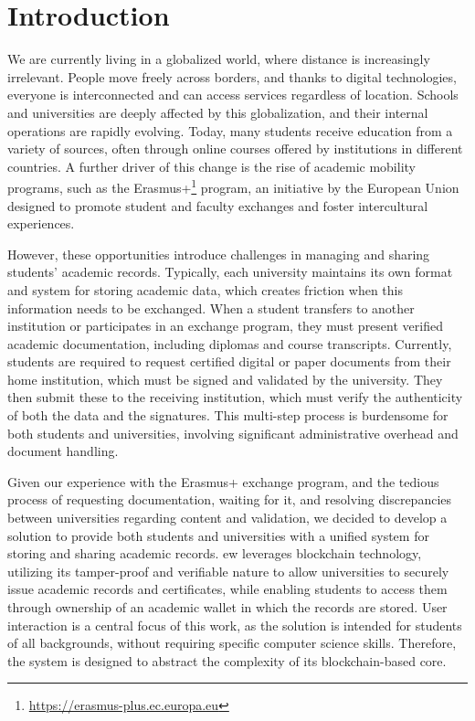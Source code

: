 \chapter{Introduction}
\label{chap:introduction}
We are currently living in a globalized world, where distance is increasingly irrelevant. People move freely across borders, and thanks to digital technologies, everyone is interconnected and can access services regardless of location. Schools and universities are deeply affected by this globalization, and their internal operations are rapidly evolving. Today, many students receive education from a variety of sources, often through online courses offered by institutions in different countries. 
A further driver of this change is the rise of academic mobility programs, such as the Erasmus+\footnote{\url{https://erasmus-plus.ec.europa.eu}} program, an initiative by the European Union designed to promote student and faculty exchanges and foster intercultural experiences.

However, these opportunities introduce challenges in managing and sharing students' academic records. Typically, each university maintains its own format and system for storing academic data, which creates friction when this information needs to be exchanged. When a student transfers to another institution or participates in an exchange program, they must present verified academic documentation, including diplomas and course transcripts. Currently, students are required to request certified digital or paper documents from their home institution, which must be signed and validated by the university. They then submit these to the receiving institution, which must verify the authenticity of both the data and the signatures. This multi-step process is burdensome for both students and universities, involving significant administrative overhead and document handling.

Given our experience with the Erasmus+ exchange program, and the tedious process of requesting documentation, waiting for it, and resolving discrepancies between universities regarding content and validation, we decided to develop a solution to provide both students and universities with a unified system for storing and sharing academic records. \gls{ew} leverages blockchain technology, utilizing its tamper-proof and verifiable nature to allow universities to securely issue academic records and certificates, while enabling students to access them through ownership of an academic wallet in which the records are stored. User interaction is a central focus of this work, as the solution is intended for students of all backgrounds, without requiring specific computer science skills. Therefore, the system is designed to abstract the complexity of its blockchain-based core.

